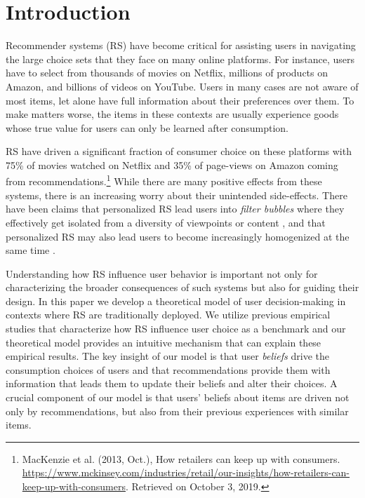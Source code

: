 \documentclass[manuscript]{acmart}
\title[\PaperTitle]{\PaperTitle}
\begin{document}
\maketitle


\section{Introduction}

Recommender systems (RS) have become critical for assisting users in navigating the large choice sets that they face on many online platforms. For instance, users have to select from thousands of movies on Netflix, millions of products on Amazon, and billions of videos on YouTube. Users in many cases are not aware of most items, let alone have full information about their preferences over them. To make matters worse, the items in these contexts are usually experience goods whose true value for users can only be learned after consumption.
\par

RS have driven a significant fraction of consumer choice on these platforms with 75\% of movies watched on Netflix and 35\% of page-views on Amazon coming from recommendations.\footnote{MacKenzie et al. (2013, Oct.),  How retailers can keep up with consumers. \url{https://www.mckinsey.com/industries/retail/our-insights/how-retailers-can-keep-up-with-consumers}. Retrieved on October 3, 2019.} While there are many positive effects from these systems, there is an increasing worry about their unintended side-effects. There have been claims that personalized RS lead users into \textit{filter bubbles} where they effectively get isolated from a diversity of viewpoints or content \cite{pariser2011filter}, and that personalized RS may also lead users to become increasingly homogenized at the same time \cite{chaney2018algorithmic, hosanagar2013will}.
\par
Understanding how RS influence user behavior is important not only for characterizing the broader consequences of such systems but also for guiding their design. In this paper we develop a theoretical model of user decision-making in contexts where RS are traditionally deployed. We utilize previous empirical studies that characterize how RS influence user choice as a benchmark and our theoretical model provides an intuitive mechanism that can explain these empirical results. The key insight of our model is that user \textit{beliefs} drive the consumption choices of users and that recommendations provide them with information that leads them to update their beliefs and alter their choices. A crucial component of our model is that users' beliefs about items are driven not only by recommendations, but also from their previous experiences with similar items. 
\end{document}
